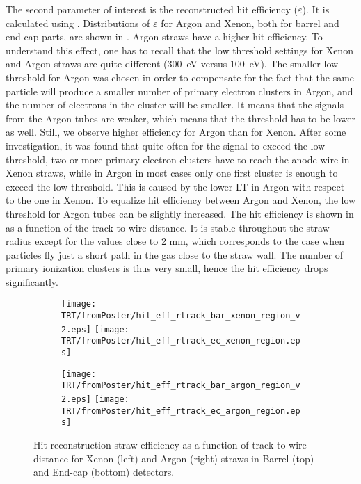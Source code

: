 The second parameter of interest is the reconstructed hit efficiency ($\varepsilon$). It is calculated using .
Distributions of $\varepsilon$ for Argon and Xenon, both for barrel and end-cap parts, are shown in .
Argon straws have a higher hit efficiency. To understand this effect, one has to recall that the low threshold settings
for Xenon and Argon straws are quite different (300~eV versus 100~eV). The smaller low threshold for Argon was chosen in order to compensate for the fact that the same particle will produce a smaller number of primary electron clusters in Argon, 
and the number of electrons in the cluster will be smaller. It means that the signals from the Argon tubes are weaker, which means
that the threshold has to be lower as well. Still, we observe higher efficiency for Argon than for Xenon. After some investigation, it was found that quite often for the signal to exceed the low threshold, two or more primary electron clusters have to reach the anode wire in
Xenon straws, while in Argon in most cases only one first cluster is enough to exceed the low threshold. This is caused by the lower LT in Argon with respect to the one in Xenon.
To equalize hit efficiency between Argon and Xenon, the low threshold for Argon tubes can be slightly increased.
The hit efficiency is shown in  as a function of the track to wire distance. 
It is stable throughout the straw radius except for the values close to 2 mm, which corresponds
to the case when particles fly just a short path in the gas close to the straw wall. 
The number of primary ionization clusters is thus very small, hence the hit efficiency drops significantly.

\begin{figure}[h]

\begin{subfigure}{.5\textwidth}
  \centering
  \texttt{[image: TRT/fromPoster/hit\_eff\_rtrack\_bar\_xenon\_region\_v2.eps]}
  \texttt{[image: TRT/fromPoster/hit\_eff\_rtrack\_ec\_xenon\_region.eps]}
\end{subfigure}%
\begin{subfigure}{.5\textwidth}
  \centering
  \texttt{[image: TRT/fromPoster/hit\_eff\_rtrack\_bar\_argon\_region\_v2.eps]}
  \texttt{[image: TRT/fromPoster/hit\_eff\_rtrack\_ec\_argon\_region.eps]}
\end{subfigure}

\caption{Hit reconstruction straw efficiency as a function of track to wire distance 
for Xenon (left) and Argon (right) straws in Barrel (top) and End-cap (bottom) detectors.}
  \label{fig:hit_eff_rtrack_bar}
\end{figure}

